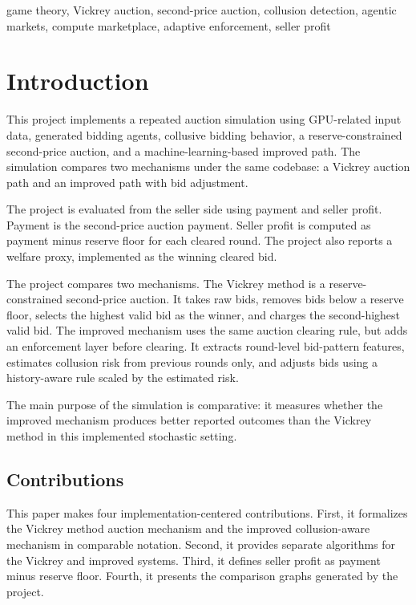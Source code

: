 \documentclass[conference]{IEEEtran}
\begin{document}
\begin{IEEEkeywords}
game theory, Vickrey auction, second-price auction, collusion detection, agentic markets, compute marketplace, adaptive enforcement, seller profit
\end{IEEEkeywords}

\section{Introduction}
This project implements a repeated auction simulation using GPU-related input data, generated bidding agents, collusive bidding behavior, a reserve-constrained second-price auction, and a machine-learning-based improved path. The simulation compares two mechanisms under the same codebase: a Vickrey auction path and an improved path with bid adjustment.

The project is evaluated from the seller side using payment and seller profit. Payment is the second-price auction payment. Seller profit is computed as payment minus reserve floor for each cleared round. The project also reports a welfare proxy, implemented as the winning cleared bid.

The project compares two mechanisms. The Vickrey method is a reserve-constrained second-price auction. It takes raw bids, removes bids below a reserve floor, selects the highest valid bid as the winner, and charges the second-highest valid bid. The improved mechanism uses the same auction clearing rule, but adds an enforcement layer before clearing. It extracts round-level bid-pattern features, estimates collusion risk from previous rounds only, and adjusts bids using a history-aware rule scaled by the estimated risk.

The main purpose of the simulation is comparative: it measures whether the improved mechanism produces better reported outcomes than the Vickrey method in this implemented stochastic setting.

\subsection{Contributions}
This paper makes four implementation-centered contributions. First, it formalizes the Vickrey method auction mechanism and the improved collusion-aware mechanism in comparable notation. Second, it provides separate algorithms for the Vickrey and improved systems. Third, it defines seller profit as payment minus reserve floor. Fourth, it presents the comparison graphs generated by the project.
\end{document}
